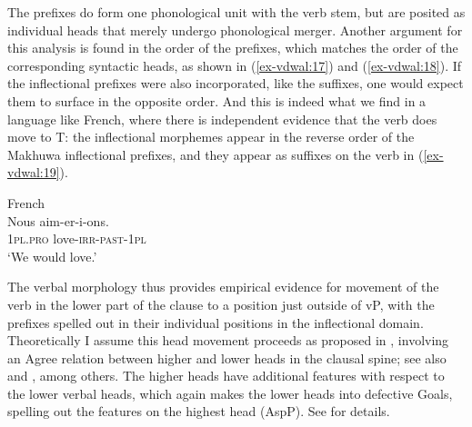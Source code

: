 \documentclass[output=paper
,modfonts
,nonflat]{langsci/langscibook}
\begin{document}
The prefixes do form one phonological unit with the verb stem, but are posited as individual heads that merely undergo phonological merger. Another argument for this analysis is found in the order of the prefixes, which matches the order of the corresponding syntactic heads, as shown in (\ref{ex-vdwal:17}) and (\ref{ex-vdwal:18}). If the inflectional prefixes were also incorporated, like the suffixes, one would expect them to surface in the opposite order. And this is indeed what we find in a language like French, where there is independent evidence that the verb does move to T: the inflectional morphemes appear in the reverse order of the Makhuwa inflectional prefixes, and they appear as suffixes on the verb in (\ref{ex-vdwal:19}). 

 \vspace{-0.2cm}
\begin{figure}[!h]
\begin{exe}
\end{exe} \vspace{-0.5cm}
\end{figure} \newpage
	\begin{exe}
		\ex French \label{ex-vdwal:19} \\
		\gll Nous aim-er-i-ons.\\
		1\textsc{pl}.\textsc{pro} love-\textsc{irr}-\textsc{past}-1\textsc{pl}\\
		\glt `We would love.'
\end{exe} 
The verbal morphology thus provides empirical evidence for movement of the verb in the lower part of the clause to a position just outside of vP, with the prefixes spelled out in their individual positions in the inflectional domain. Theoretically I assume this head movement proceeds as proposed in \citet{Roberts2010}, involving an Agree relation between higher and lower heads in the clausal spine; see also \citet{Adger2003} and \citet{Bjorkman2011}, among others. The higher heads have additional features with respect to the lower verbal heads, which again makes the lower heads into defective Goals, spelling out the features on the highest head (AspP). See \citet{Roberts2010} for details.
\end{document}
